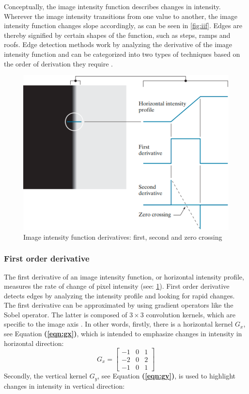 \noindent
Conceptually, the image intensity function describes changes in intensity.
Wherever the image intensity transitions from one value to another,
the image intensity function changes slope accordingly, as can be seen in \cref{fig:iif}.
Edges are thereby signified by certain shapes of the function, such as steps, ramps and roofs.
Edge detection methods work by analyzing the derivative of the image intensity function and
can be categorized into two types of techniques based on the order of derivation they require \cite{gonzalezDigitalImageProcessing2007}.
\begin{figure}[h]
	\centerline{\includegraphics[scale=0.5]{images/edgeModelOrders.png}}
	\caption{Image intensity function derivatives: first, second and zero crossing \cite{gonzalezDigitalImageProcessing2007}}\label{fig:iifO}
\end{figure}
\pagebreak

\noindent
\subsubsection*{First order derivative}
The first derivative of an image intensity function, or horizontal intensity profile,
measures the rate of change of pixel intensity (see: \cref{fig:iifO}).
First order derivative detects edges by analyzing the intensity profile and looking for rapid changes.
The first derivative can be approximated by using gradient operators like the Sobel operator.
The latter is composed of $3 \times 3$ convolution kernels,
which are specific to the image axis \cite{gonzalezDigitalImageProcessing2007}.
In other words, firstly, there is a horizontal kernel $G_{x}$, see Equation \textbf{(\ref{eqn:gx})}, which is intended to emphasize changes in
intensity in horizontal direction:
\begin{equation}\label{eqn:gx}
	G_{x} =
	\begin{bmatrix}
		-1 & 0 & 1 \\
		-2 & 0 & 2 \\
		-1 & 0 & 1
	\end{bmatrix}
\end{equation}
\noindent
Secondly, the vertical kernel $G_{y}$, see Equation \textbf{(\ref{eqn:gy})}, is used to highlight changes in intensity in vertical direction:

